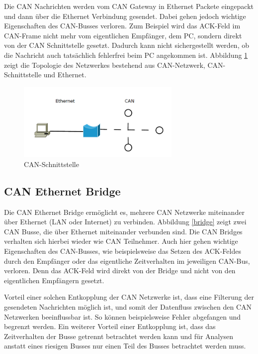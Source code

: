 Die CAN Nachrichten werden vom CAN Gateway in Ethernet Packete eingepackt und dann 
über die Ethernet Verbindung gesendet. Dabei gehen jedoch wichtige Eigenschaften des 
CAN-Busses verloren. Zum Beispiel wird das ACK-Feld im CAN-Frame nicht mehr vom 
eigentlichen Empfänger, dem PC, sondern direkt von der CAN Schnittstelle gesetzt. Dadurch 
kann nicht sichergestellt werden, ob die Nachricht auch tatsächlich fehlerfrei beim PC angekommen ist.
Abbildung \ref{gateway} zeigt die Topologie des Netzwerkes bestehend aus CAN-Netzwerk, 
CAN-Schnittstelle und Ethernet.

\begin{figure}[h] 
\centering
\includegraphics[width=0.7\textwidth]{figures/can_gateway}
\caption{CAN-Schnittstelle} 
\label{gateway}
\end{figure} 

\subsection{CAN Ethernet Bridge}

Die CAN Ethernet Bridge ermöglicht es, mehrere CAN Netzwerke miteinander über Ethernet 
(LAN oder Internet) zu verbinden. Abbildung \ref{bridge} zeigt zwei CAN Busse, die über 
Ethernet miteinander verbunden sind. Die CAN Bridges verhalten sich hierbei wieder wie 
CAN Teilnehmer. Auch hier gehen wichtige Eigenschaften des CAN-Busses, wie beispielsweise 
das Setzen des ACK-Feldes durch den Empfänger oder das eigentliche Zeitverhalten im 
jeweiligen CAN-Bus, verloren. Denn das ACK-Feld wird direkt von der Bridge und nicht von 
den eigentlichen Empfängern gesetzt.

Vorteil einer solchen Entkopplung der CAN Netzwerke ist, dass eine Filterung der gesendeten 
Nachrichten möglich ist, und somit der Datenfluss zwischen den CAN Netzwerken beeinflussbar 
ist. So können beispielsweise Fehler abgefangen und begrenzt werden. Ein weiterer Vorteil 
einer Entkopplung ist, dass das Zeitverhalten der Busse getrennt betrachtet werden kann 
und für Analysen anstatt eines riesigen Busses nur einen Teil des Busses betrachtet werden 
muss.


